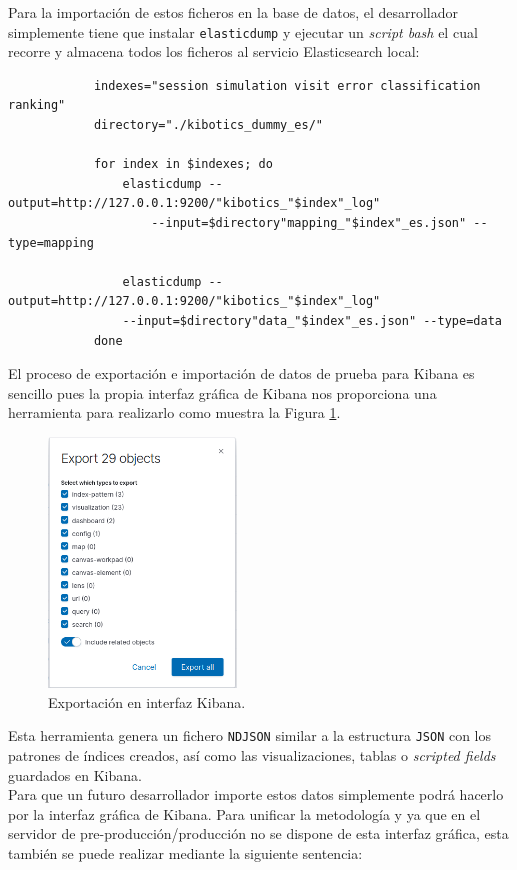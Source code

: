 \documentclass[a4paper, 12pt]{book}
\begin{document}
		Para la importación de estos ficheros en la base de datos, el desarrollador simplemente tiene que instalar \texttt{elasticdump} y ejecutar un \textit{script bash} el cual recorre y almacena todos los ficheros al servicio Elasticsearch local:
		
		{\footnotesize
		\begin{verbatim}
			indexes="session simulation visit error classification ranking"
			directory="./kibotics_dummy_es/"
			
			for index in $indexes; do
			    elasticdump --output=http://127.0.0.1:9200/"kibotics_"$index"_log" 
			        --input=$directory"mapping_"$index"_es.json" --type=mapping
			
			    elasticdump --output=http://127.0.0.1:9200/"kibotics_"$index"_log" 
		        --input=$directory"data_"$index"_es.json" --type=data
			done
		\end{verbatim}
		}
		
		El proceso de exportación e importación de datos de prueba para Kibana es sencillo pues la propia interfaz gráfica de Kibana nos proporciona una herramienta para realizarlo como muestra la Figura \ref{fig:export_kibana}.
		
		\begin{figure}[H]
			\centering
			\includegraphics[width=5cm, keepaspectratio]{img/export_kibana.png}
			\caption{Exportación en interfaz Kibana.}
			\label{fig:export_kibana}
		\end{figure}
		
		Esta herramienta genera un fichero \texttt{NDJSON} similar a la estructura \texttt{JSON} con los patrones de índices creados, así como las visualizaciones, tablas o \textit{scripted fields} guardados en Kibana.\\
		
		Para que un futuro desarrollador importe estos datos simplemente podrá hacerlo por la interfaz gráfica de Kibana. Para unificar la metodología y ya que en el servidor de pre-producción/producción no se dispone de esta interfaz gráfica, esta también se puede realizar mediante la siguiente sentencia:\\
		
\end{document}

